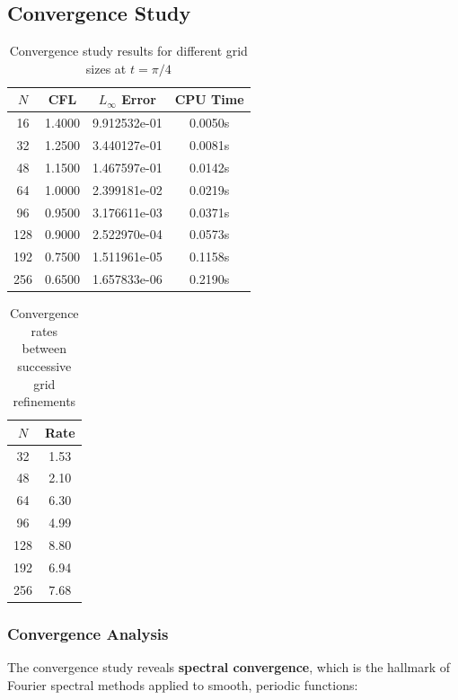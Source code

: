 \subsection{Convergence Study}
\begin{table}[H]
	\centering
	\begin{tabular}{|c|c|c|c|}
		\hline
		$N$ & CFL    & $L_\infty$ Error & CPU Time \\
		\hline
		16  & 1.4000 & 9.912532e-01     & 0.0050s  \\
		32  & 1.2500 & 3.440127e-01     & 0.0081s  \\
		48  & 1.1500 & 1.467597e-01     & 0.0142s  \\
		64  & 1.0000 & 2.399181e-02     & 0.0219s  \\
		96  & 0.9500 & 3.176611e-03     & 0.0371s  \\
		128 & 0.9000 & 2.522970e-04     & 0.0573s  \\
		192 & 0.7500 & 1.511961e-05     & 0.1158s  \\
		256 & 0.6500 & 1.657833e-06     & 0.2190s  \\
		\hline
	\end{tabular}
	\caption{Convergence study results for different grid sizes at $t = \pi/4$}
	\label{tab:convergence}
\end{table}

\begin{table}[H]
	\centering
	\begin{tabular}{|c|c|}
		\hline
		$N$ & Rate \\
		\hline
		32  & 1.53 \\
		48  & 2.10 \\
		64  & 6.30 \\
		96  & 4.99 \\
		128 & 8.80 \\
		192 & 6.94 \\
		256 & 7.68 \\
		\hline
	\end{tabular}
	\caption{Convergence rates between successive grid refinements}
	\label{tab:rates}
\end{table}

\subsubsection{Convergence Analysis}
The convergence study reveals \textbf{spectral convergence}, which is the hallmark of Fourier spectral methods applied to smooth, periodic functions:

